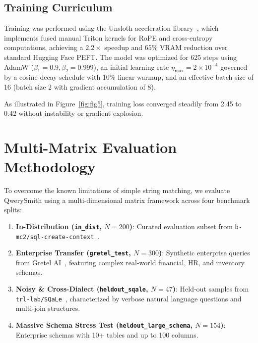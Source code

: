\documentclass[10pt,twocolumn,letterpaper]{article}
\theoremstyle{definition}
\begin{document}
\subsection{Training Curriculum}
Training was performed using the Unsloth acceleration library~\cite{unsloth2023}, which implements fused manual Triton kernels for RoPE and cross-entropy computations, achieving a $2.2\times$ speedup and $65\%$ VRAM reduction over standard Hugging Face PEFT. The model was optimized for 625 steps using AdamW ($\beta_1=0.9, \beta_2=0.999$), an initial learning rate $\eta_{\max} = 2 \times 10^{-4}$ governed by a cosine decay schedule with 10\% linear warmup, and an effective batch size of 16 (batch size 2 with gradient accumulation of 8).

As illustrated in Figure~\ref{fig:fig5}, training loss converged steadily from 2.45 to 0.42 without instability or gradient explosion.

\section{Multi-Matrix Evaluation Methodology}
\label{sec:eval_method}

To overcome the known limitations of simple string matching, we evaluate QwerySmith using a multi-dimensional matrix framework across four benchmark splits:
\begin{enumerate}
    \item \textbf{In-Distribution (\texttt{in\_dist}, $N=200$)}: Curated evaluation subset from \texttt{b-mc2/sql-create-context}~\cite{bmc2_2023_sqlcreatecontext}.
    \item \textbf{Enterprise Transfer (\texttt{gretel\_test}, $N=300$)}: Synthetic enterprise queries from Gretel AI~\cite{gretel2023synthetic}, featuring complex real-world financial, HR, and inventory schemas.
    \item \textbf{Noisy \& Cross-Dialect (\texttt{heldout\_sqale}, $N=47$)}: Held-out samples from \texttt{trl-lab/SQaLe}~\cite{sqale2024}, characterized by verbose natural language questions and multi-join structures.
    \item \textbf{Massive Schema Stress Test (\texttt{heldout\_large\_schema}, $N=154$)}: Enterprise schemas with 10+ tables and up to 100 columns.
\end{enumerate}
\end{document}
